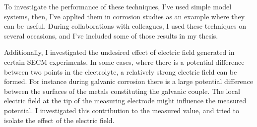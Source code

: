 To investigate the performance of these techniques, I've used simple model systems, then, I've applied them in corrosion studies as an example where they can be useful.
During collaborations with colleagues, I used these techniques on several occasions, and I've included some of those results in my thesis.

Additionally, I investigated the undesired effect of electric field generated in certain SECM experiments.
In some cases, where there is a potential difference between two points in the electrolyte, a relatively strong electric field can be formed.
For instance during galvanic corrosion there is a large potential difference between the surfaces of the metals constituting the galvanic couple.
The local electric field at the tip of the measuring electrode might influence the measured potential.
I investigated this contribution to the measured value, and tried to isolate the effect of the electric field.
